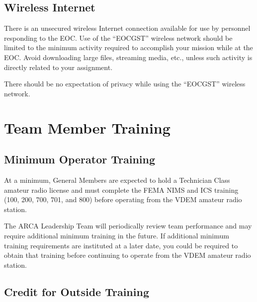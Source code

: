 \documentclass[pdflatex,letterpaper,twoside,12pt]{book}
\begin{document}
\section{Wireless Internet}

There is an unsecured wireless Internet connection available for use by personnel responding to the EOC.  Use of the ``EOCGST'' wireless network should be limited to the minimum activity required to accomplish your mission while at the EOC.  Avoid downloading large files, streaming media, etc., unless such activity is directly related to your assignment.

There should be no expectation of privacy while using the ``EOCGST'' wireless network.


\chapter{Team Member Training}

\section{Minimum Operator Training}

At a minimum, General Members are expected to hold a Technician Class amateur radio license and must complete the FEMA NIMS and ICS training (100, 200, 700, 701, and 800) before operating from the VDEM amateur radio station.

The ARCA Leadership Team will periodically review team performance and may require additional minimum training in the future.  If additional minimum training requirements are instituted at a later date, you could be required to obtain that training before continuing to operate from the VDEM amateur radio station.


\section{Credit for Outside Training}
\end{document}
